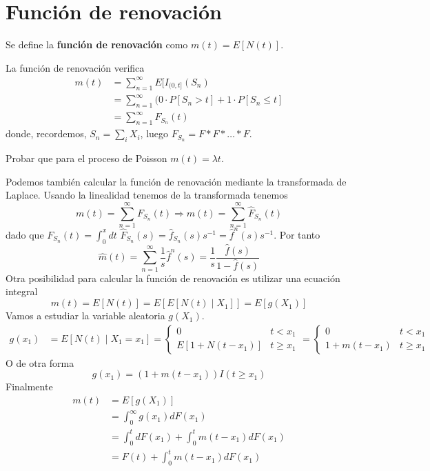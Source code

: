 \documentclass[PREyA.tex]{subfiles}
\begin{document}
\section{Función de renovación}
\begin{defi}
Se define la \textbf{función de renovación } como $m(t)=E[N(t)]$. 
\end{defi}
\begin{prop}
La función de renovación verifica 
\begin{align*}
m(t)&= \sum_{n=1}^\infty E[I_{(0,t]}(S_n) \\
&= \sum_{n=1}^\infty (0\cdot P[S_n > t] + 1\cdot P[S_n \leq t]\\
&= \sum_{n=1}^\infty F_{S_n}(t)
\end{align*}
donde, recordemos, $S_n = \sum_i X_i$, luego $F_{S_n} = F *F *\dotsc *F$.
\end{prop}
\begin{example}
Probar que para el proceso de Poisson $m(t)=\lambda t$.
\end{example}
Podemos también calcular la función de renovación mediante la transformada de Laplace. Usando la linealidad tenemos de la transformada tenemos
$$
m(t) = \sum_{n=1}^\infty F_{S_n}(t) \Rightarrow \hat{m}(t) = \sum_{n=1}^\infty \hat{F}_{S_n}(t)
$$
dado que $F_{S_n}(t) = \int_0^x dt$ $\hat{F}_{S_n}(s) = \hat{f}_{S_n}(s)s^{-1} = \hat{f}^n(s)s^{-1}$. Por tanto
$$
\hat{m}(t) = \sum_{n=1}^\infty\frac{1}{s}\hat{f}^n(s) = \frac{1}{s}\frac{\hat{f}(s)}{1-\hat{f}(s)}
$$ 
\newpage
Otra posibilidad para calcular la función de renovación es utilizar una ecuación integral
$$
m(t) = E[N(t)] = E[E[N(t)\mid X_1]] = E[g(X_1)]
$$
Vamos a estudiar la variable aleatoria $g(X_1)$. 
\begin{align*}
g(x_1) &= E[N(t)\mid X_1=x_1]= \begin{cases}
0 & t<x_1\\
E[1+N(t-x_1)] & t\geq x_1
\end{cases}
= \begin{cases}
0 & t<x_1\\
1+m  (t-x_1)& t\geq x_1
\end{cases}
\end{align*}
O de otra forma
$$
g(x_1) = (1+m(t-x_1))I(t\geq x_1)
$$
Finalmente
\begin{align*}
m(t) &= E[g(X_1)] \\
& = \int_0^\infty g(x_1)dF(x_1) \\
&= \int_0^t dF(x_1) + \int_0^t m(t-x_1)dF(x_1)\\
&= F(t) + \int_0^t m(t-x_1)dF(x_1)
\end{align*}
\end{document}
